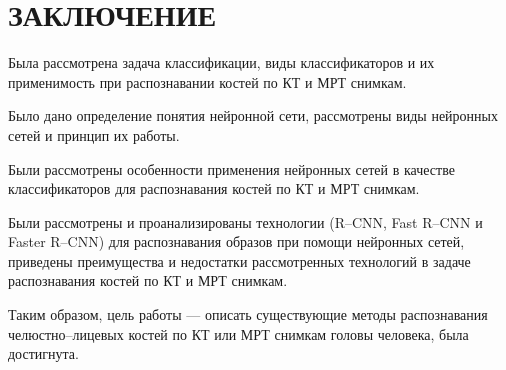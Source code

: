 \section*{ЗАКЛЮЧЕНИЕ}

Была рассмотрена задача классификации, виды классификаторов и их применимость при распознавании костей по КТ и МРТ снимкам.

Было дано определение понятия нейронной сети, рассмотрены виды нейронных сетей и принцип их работы.

Были рассмотрены особенности применения нейронных сетей в качестве классификаторов для распознавания костей по КТ и МРТ снимкам.

Были рассмотрены и проанализированы технологии (R--CNN, Fast R--CNN и Faster R--CNN) для распознавания образов при помощи нейронных сетей, приведены преимущества и недостатки рассмотренных технологий в задаче распознавания костей по КТ и МРТ снимкам.

Таким образом, цель работы --- описать существующие методы распознавания челюстно--лицевых костей по КТ или МРТ снимкам головы человека, была достигнута.